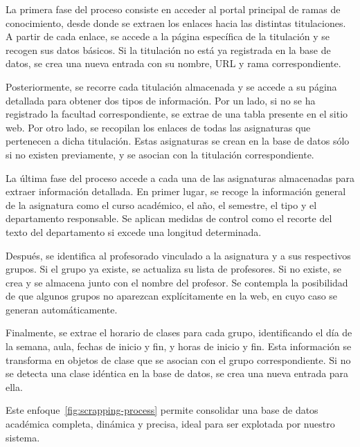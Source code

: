 La primera fase del proceso consiste en acceder al portal principal de ramas de conocimiento, desde donde se extraen los enlaces hacia las distintas titulaciones. A partir de cada enlace, se accede a la página específica de la titulación y se recogen sus datos básicos. Si la titulación no está ya registrada en la base de datos, se crea una nueva entrada con su nombre, URL y rama correspondiente.

Posteriormente, se recorre cada titulación almacenada y se accede a su página detallada para obtener dos tipos de información. Por un lado, si no se ha registrado la facultad correspondiente, se extrae de una tabla presente en el sitio web. Por otro lado, se recopilan los enlaces de todas las asignaturas que pertenecen a dicha titulación. Estas asignaturas se crean en la base de datos sólo si no existen previamente, y se asocian con la titulación correspondiente.

La última fase del proceso accede a cada una de las asignaturas almacenadas para extraer información detallada. En primer lugar, se recoge la información general de la asignatura como el curso académico, el año, el semestre, el tipo y el departamento responsable. Se aplican medidas de control como el recorte del texto del departamento si excede una longitud determinada.

Después, se identifica al profesorado vinculado a la asignatura y a sus respectivos grupos. Si el grupo ya existe, se actualiza su lista de profesores. Si no existe, se crea y se almacena junto con el nombre del profesor. Se contempla la posibilidad de que algunos grupos no aparezcan explícitamente en la web, en cuyo caso se generan automáticamente.

Finalmente, se extrae el horario de clases para cada grupo, identificando el día de la semana, aula, fechas de inicio y fin, y horas de inicio y fin. Esta información se transforma en objetos de clase que se asocian con el grupo correspondiente. Si no se detecta una clase idéntica en la base de datos, se crea una nueva entrada para ella.

Este enfoque~\ref{fig:scrapping-process} permite consolidar una base de datos académica completa, dinámica y precisa, ideal para ser explotada por nuestro sistema.

